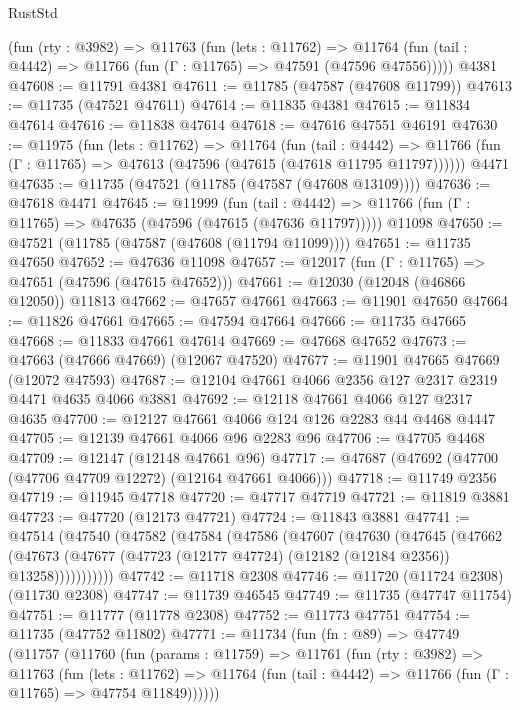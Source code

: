 \begin{lexlean}{RustStd}
\begin{coremodule}
    (fun (rty : @3982) =>
    @11763
      (fun (lets : @11762) =>
      @11764 (fun (tail : @4442) => @11766 (fun (Γ : @11765) => @47591 (@47596 @47556)))))
    @4381
@47608 := @11791 @4381
@47611 := @11785 (@47587 (@47608 @11799))
@47613 := @11735 (@47521 @47611)
@47614 := @11835 @4381
@47615 := @11834 @47614
@47616 := @11838 @47614
@47618 := @47616 @47551 @46191
@47630 := @11975
    (fun (lets : @11762) =>
    @11764
      (fun (tail : @4442) =>
      @11766 (fun (Γ : @11765) => @47613 (@47596 (@47615 (@47618 @11795 @11797))))))
    @4471
@47635 := @11735 (@47521 (@11785 (@47587 (@47608 @13109))))
@47636 := @47618 @4471
@47645 := @11999
    (fun (tail : @4442) => @11766 (fun (Γ : @11765) => @47635 (@47596 (@47615 (@47636 @11797)))))
    @11098
@47650 := @47521 (@11785 (@47587 (@47608 (@11794 @11099))))
@47651 := @11735 @47650
@47652 := @47636 @11098
@47657 := @12017 (fun (Γ : @11765) => @47651 (@47596 (@47615 @47652)))
@47661 := @12030 (@12048 (@46866 @12050)) @11813
@47662 := @47657 @47661
@47663 := @11901 @47650
@47664 := @11826 @47661
@47665 := @47594 @47664
@47666 := @11735 @47665
@47668 := @11833 @47661 @47614
@47669 := @47668 @47652
@47673 := @47663 (@47666 @47669) (@12067 @47520)
@47677 := @11901 @47665 @47669 (@12072 @47593)
@47687 := @12104 @47661 @4066 @2356 @127 @2317 @2319 @4471 @4635 @4066 @3881
@47692 := @12118 @47661 @4066 @127 @2317 @4635
@47700 := @12127 @47661 @4066 @124 @126 @2283 @44 @4468 @4447
@47705 := @12139 @47661 @4066 @96 @2283 @96
@47706 := @47705 @4468
@47709 := @12147 (@12148 @47661 @96)
@47717 := @47687 (@47692 (@47700 (@47706 @47709 @12272) (@12164 @47661 @4066)))
@47718 := @11749 @2356
@47719 := @11945 @47718
@47720 := @47717 @47719
@47721 := @11819 @3881
@47723 := @47720 (@12173 @47721)
@47724 := @11843 @3881
@47741 := @47514
    (@47540
      (@47582
        (@47584
          (@47586
            (@47607
              (@47630
                (@47645
                  (@47662
                    (@47673
                      (@47677 (@47723 (@12177 @47724) (@12182 (@12184 @2356)) @13258)))))))))))
@47742 := @11718 @2308
@47746 := @11720 (@11724 @2308) (@11730 @2308)
@47747 := @11739 @46545
@47749 := @11735 (@47747 @11754)
@47751 := @11777 (@11778 @2308)
@47752 := @11773 @47751
@47754 := @11735 (@47752 @11802)
@47771 := @11734
    (fun (fn : @89) =>
    @47749
      (@11757
        (@11760
          (fun (params : @11759) =>
          @11761
            (fun (rty : @3982) =>
            @11763
              (fun (lets : @11762) =>
              @11764 (fun (tail : @4442) => @11766 (fun (Γ : @11765) => @47754 @11849))))))

\end{coremodule}
\end{lexlean}
